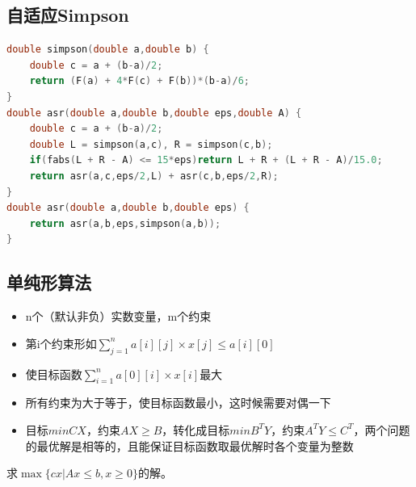 \documentclass[UTF8,a4paper,titlepage]{ctexart}
\begin{document}
\subsection{自适应Simpson}
      
\begin{lstlisting}[language=C++]
double simpson(double a,double b) {
    double c = a + (b-a)/2;
    return (F(a) + 4*F(c) + F(b))*(b-a)/6;
}
double asr(double a,double b,double eps,double A) {
    double c = a + (b-a)/2;
    double L = simpson(a,c), R = simpson(c,b);
    if(fabs(L + R - A) <= 15*eps)return L + R + (L + R - A)/15.0;
    return asr(a,c,eps/2,L) + asr(c,b,eps/2,R);
}
double asr(double a,double b,double eps) {
    return asr(a,b,eps,simpson(a,b));
}
\end{lstlisting}
   	\subsection{单纯形算法}
\begin{itemize}
\item n个（默认非负）实数变量，m个约束
\item 第i个约束形如$ \sum_{j=1}^{n}a[i][j]\times x[j] \leq a[i][0] $
\item 使目标函数$ \sum_{i=1}^{n}a[0][i] \times x[i]$最大
\item 所有约束为大于等于，使目标函数最小，这时候需要对偶一下
\item 目标$min{CX}$，约束$AX\geq B$，转化成目标$min{B^T Y}$，约束$A^T Y \leq C^T$，两个问题的最优解是相等的，且能保证目标函数取最优解时各个变量为整数
\end{itemize}
求$\max\{cx|Ax\leq b,x\geq0\}$的解。
\end{document}
